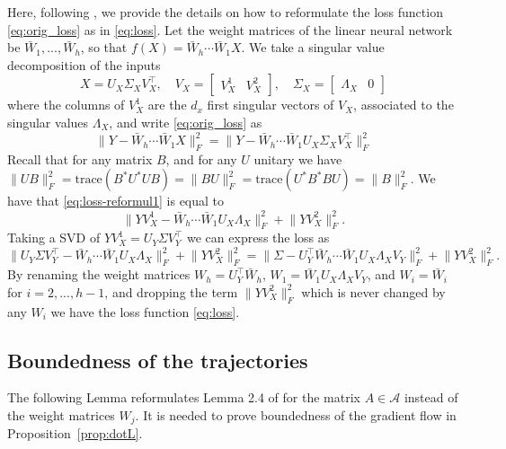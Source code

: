 \documentclass{article}
\newcommand{\1}{\mathds{1}}
\begin{document}
Here, following \cite{chitour2018geometric}, we provide the details on how to reformulate the loss function \eqref{eq:orig_loss} as in \eqref{eq:loss}. Let the weight matrices of the linear neural network be $\bar{W}_1,...,\bar{W}_h$, so that $f(X)=\bar{W}_h\cdots \bar{W}_1X$. We take a singular value decomposition of the inputs
\begin{equation}
    X=U_X\Sigma_X V_X^\top, \quad V_X=\begin{bmatrix}
        V_X^1 & V_X^2
    \end{bmatrix}, \quad \Sigma_X=\begin{bmatrix}
        \Lambda_X & 0
    \end{bmatrix}
\end{equation}
where the columns of $V_X^1$ are the $d_x$ first singular vectors of $V_X$, associated to the singular values $\Lambda_X $, and write \eqref{eq:orig_loss} as
\begin{equation}
    \lVert Y-\bar{W}_h\cdots \bar{W}_1X\rVert_F^2 = \lVert Y-\bar{W}_h\cdots \bar{W}_1U_X\Sigma_X V_X^\top\rVert_F^2 
    \label{eq:loss-reformul1}
\end{equation}
Recall that for any matrix $B$, and for any $U$ unitary we have $\lVert U B \rVert_F^2=\text{trace}(B^*U^*UB)=\lVert B U\rVert_F^2=\text{trace}(U^*B^*BU)=\lVert B\rVert_F^2$. We have that \eqref{eq:loss-reformul1} is equal to
\begin{equation*}
    \lVert YV_X^1-\bar{W}_h\cdots \bar{W}_1U_X \Lambda_X  \rVert_F^2 + \lVert YV_X^2 \rVert_F^2.
\end{equation*}
Taking a SVD of $YV_X^1=U_Y\Sigma V_Y^\top$ we can express the loss as
\begin{equation}\label{eq:sep_loss}
    \lVert U_Y\Sigma V_Y^\top -\bar{W}_h\cdots \bar{W}_1U_X \Lambda_X  \rVert_F^2 + \lVert YV_X^2 \rVert_F^2 = \lVert \Sigma - U_Y^\top\bar{W}_h\cdots \bar{W}_1U_X \Lambda_X V_Y \rVert_F^2 + \lVert YV_X^2 \rVert_F^2.
\end{equation}
By renaming the weight matrices $W_h=U_Y^\top\bar{W}_h$, $W_1=\bar{W}_1U_X \Lambda_X V_Y$, and $W_i=\bar{W}_i$ for $i=2,...,h-1$, and dropping the term $\lVert YV_X^2 \rVert_F^2$ which is never changed by any $W_i$ we have the loss function \eqref{eq:loss}.


\subsection{Boundedness of the trajectories}
\label{app:bounded}
The following Lemma reformulates Lemma 2.4 of \cite{chitour2018geometric} for the matrix $A \in \mathcal{A}$ instead of the weight matrices $W_j$. It is needed to prove boundedness of the gradient flow in Proposition~\ref{prop:dotL}.
\end{document}
